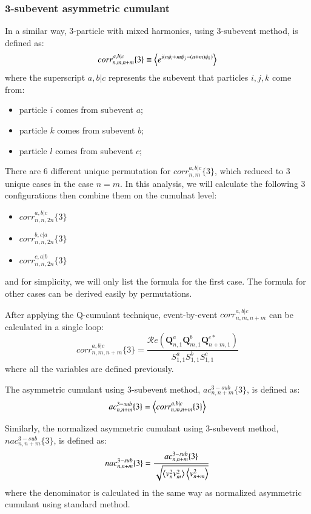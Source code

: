 \subsubsection{3-subevent asymmetric cumulant}
In a similar way, 3-particle with mixed harmonics, using 3-subevent method, is defined as:
\begin{equation}
corr_{n,m,n+m}^{a,b|c}\{3\}\equiv\left\langle e^{\text{i}(n\phi_i+m\phi_j-(n+m)\phi_k)}\right\rangle
\end{equation}
where the superscript $a,b|c$ represents the subevent that particles $i,j,k$ come from:
\begin{itemize}
\item particle $i$ comes from subevent $a$;
\item particle $k$ comes from subevent $b$;
\item particle $l$ comes from subevent $c$;
\end{itemize}

There are 6 different unique permutation for $corr_{n,m}^{a,b|c}\{3\}$, which reduced to 3 unique cases in the case $n=m$. In this analysis, we will calculate the following 3 configurations then combine them on the cumulnat level:
\begin{itemize}
\item $corr_{n,n,2n}^{a,b|c}\{3\}$
\item $corr_{n,n,2n}^{b,c|a}\{3\}$
\item $corr_{n,n,2n}^{c,a|b}\{3\}$
\end{itemize}
and for simplicity, we will only list the formula for the first case. The formula for other cases can be derived easily by permutations.

After applying the Q-cumulant technique, event-by-event $corr_{n,m,n+m}^{a,b|c}$ can be calculated in a single loop:
\begin{equation}
corr_{n,m,n+m}^{a,b|c}\{3\} = \frac{\mathcal{R}\textit{e}(\pmb{Q}_{n,1}^a\pmb{Q}_{m,1}^b\pmb{Q}_{n+m,1}^{c*})}{S_{1,1}^a S_{1,1}^b S_{1,1}^c}
\end{equation}
where all the variables are defined previously.

The asymmetric cumulant using 3-subevent method, $ac_{n,n+m}^{3-sub}\{3\}$, is defined as:
\begin{equation}
ac_{n,n+m}^{3-sub}\{3\} = \left\langle corr_{n,m,n+m}^{a,b|c}\{3\}\right\rangle
\end{equation}

Similarly, the normalized asymmetric cumulant using 3-subevent method, $nac_{n,n+m}^{3-sub}\{3\}$, is defined as:
\begin{equation}
nac_{n,n+m}^{3-sub}\{3\} = \frac{ac_{n,n+m}^{3-sub}\{3\}}{\sqrt{\left\langle v_n^2 v_m^2\right\rangle\left\langle v_{n+m}^2\right\rangle}}
\end{equation}
where the denominator is calculated in the same way as normalized asymmetric cumulant using standard method.










